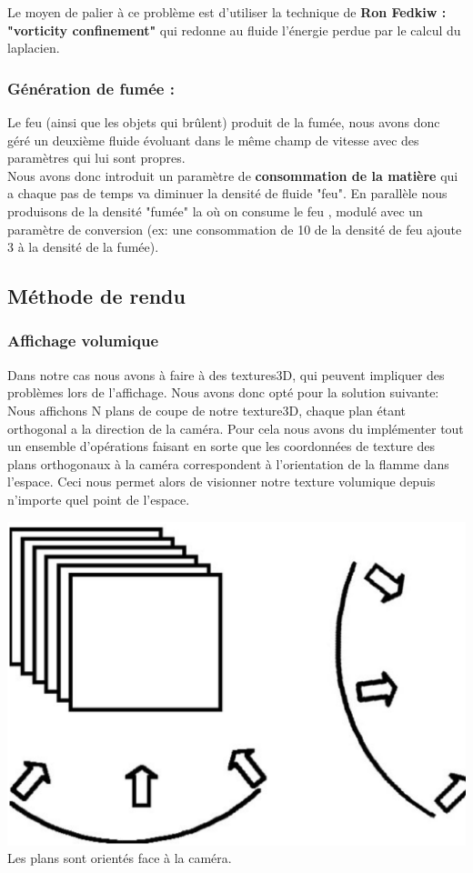 \documentclass[a4paper,10pt]{article}
\begin{document}
Le moyen de palier à ce problème est d'utiliser la technique de \textbf{Ron Fedkiw
: "vorticity confinement"} qui redonne au fluide l'énergie perdue par le
calcul du laplacien.

\subsubsection{Génération de fumée :}
Le feu (ainsi que les objets qui brûlent) produit de la fumée, nous avons donc géré un
deuxième fluide évoluant dans le même champ de vitesse avec des
paramètres qui lui sont propres.\\

Nous avons donc introduit un paramètre de \textbf{consommation de la
  matière} qui a chaque pas de temps va diminuer la densité de fluide
"feu". En parallèle nous produisons de la densité "fumée" la où on
consume le feu , modulé avec un paramètre de conversion (ex: une consommation de 10 de la densité de feu ajoute 3 à la densité de la fumée).


\subsection{Méthode de rendu}
\subsubsection{Affichage volumique}

Dans notre cas nous avons à faire à des textures3D, qui peuvent impliquer des problèmes lors de l'affichage. Nous avons donc opté pour la solution suivante:\\

Nous affichons N plans de coupe de notre texture3D, chaque plan étant orthogonal a la direction de la caméra. Pour cela nous avons du implémenter tout un ensemble d'opérations faisant en sorte que les coordonnées de texture des plans orthogonaux à 
la caméra correspondent à l'orientation de la flamme dans l'espace. Ceci nous permet alors de visionner notre texture volumique depuis n'importe quel point de l'espace.\\
\begin{center}
\includegraphics[scale=0.4]{plan_en_coupe.ps}\\
Les plans sont orientés face à la caméra.
\end{center}
\end{document}

